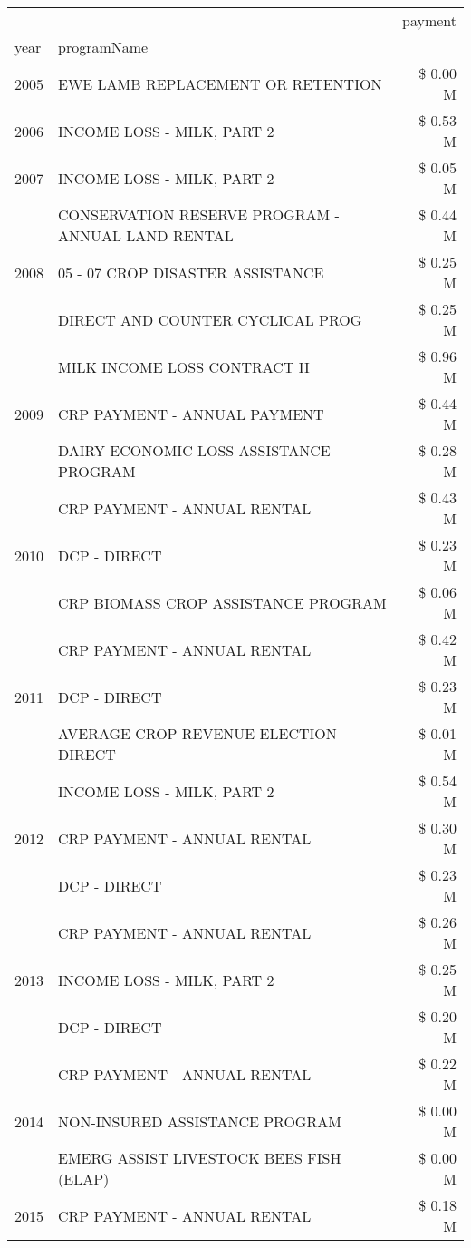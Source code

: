 \begin{tabular}{llr}
\toprule
 &  & payment \\
year & programName &  \\
\midrule
2005 & EWE LAMB REPLACEMENT OR RETENTION & \$ 0.00 M \\
\cline{1-3}
2006 & INCOME LOSS - MILK, PART 2 & \$ 0.53 M \\
\cline{1-3}
2007 & INCOME LOSS - MILK, PART 2 & \$ 0.05 M \\
\cline{1-3}
\multirow[t]{3}{*}{2008} & CONSERVATION RESERVE PROGRAM - ANNUAL LAND RENTAL & \$ 0.44 M \\
 & 05 - 07 CROP DISASTER ASSISTANCE & \$ 0.25 M \\
 & DIRECT AND COUNTER CYCLICAL PROG & \$ 0.25 M \\
\cline{1-3}
\multirow[t]{3}{*}{2009} & MILK INCOME LOSS CONTRACT II & \$ 0.96 M \\
 & CRP PAYMENT - ANNUAL PAYMENT & \$ 0.44 M \\
 & DAIRY ECONOMIC LOSS ASSISTANCE PROGRAM & \$ 0.28 M \\
\cline{1-3}
\multirow[t]{3}{*}{2010} & CRP PAYMENT - ANNUAL RENTAL & \$ 0.43 M \\
 & DCP - DIRECT & \$ 0.23 M \\
 & CRP BIOMASS CROP ASSISTANCE PROGRAM & \$ 0.06 M \\
\cline{1-3}
\multirow[t]{3}{*}{2011} & CRP PAYMENT - ANNUAL RENTAL & \$ 0.42 M \\
 & DCP - DIRECT & \$ 0.23 M \\
 & AVERAGE CROP REVENUE ELECTION-DIRECT & \$ 0.01 M \\
\cline{1-3}
\multirow[t]{3}{*}{2012} & INCOME LOSS - MILK, PART 2 & \$ 0.54 M \\
 & CRP PAYMENT - ANNUAL RENTAL & \$ 0.30 M \\
 & DCP - DIRECT & \$ 0.23 M \\
\cline{1-3}
\multirow[t]{3}{*}{2013} & CRP PAYMENT - ANNUAL RENTAL & \$ 0.26 M \\
 & INCOME LOSS - MILK, PART 2 & \$ 0.25 M \\
 & DCP - DIRECT & \$ 0.20 M \\
\cline{1-3}
\multirow[t]{3}{*}{2014} & CRP PAYMENT - ANNUAL RENTAL & \$ 0.22 M \\
 & NON-INSURED ASSISTANCE PROGRAM & \$ 0.00 M \\
 & EMERG ASSIST LIVESTOCK BEES FISH (ELAP) & \$ 0.00 M \\
\cline{1-3}
\multirow[t]{2}{*}{2015} & CRP PAYMENT - ANNUAL RENTAL & \$ 0.18 M \\

\end{tabular}
